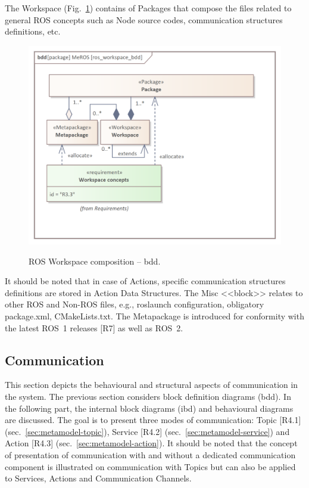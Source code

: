 \documentclass[11pt,oneside,a4paper]{article}
\begin{document}
	
	
	The Workspace (Fig.~\ref{fig:ros_workspace_bdd}) contains of Packages that compose the files related to general ROS concepts such as Node source codes, communication structures definitions, etc. 
	

	\begin{figure}[H]
		\centering
		\begin{center}
			{\includegraphics[scale=1.0]{img/meros_pkg/ros_workspace_bdd.png}}
		\end{center}
		\caption{ROS Workspace composition -- bdd.} 
		\label{fig:ros_workspace_bdd}
	\end{figure}
	
	It should be noted that in case of Actions, specific communication structures definitions are stored in Action Data Structures. The Misc <<block>> relates to other ROS and Non-ROS files, e.g., roslaunch configuration, obligatory package.xml, CMakeLists.txt. The Metapackage is introduced for conformity with the latest ROS~1 releases [R7] as well as ROS~2. 
		

	
	
	
\subsection{Communication}
\label{sec:metamodel-communication}
	
	This section depicts the behavioural and structural aspects of communication in the system. The previous section considers block definition diagrams (bdd). In the following part, the internal block diagrams (ibd) and behavioural diagrams are discussed. The goal is to present three modes of communication: Topic [R4.1] (sec.~\ref{sec:metamodel-topic}), Service [R4.2] (sec.~\ref{sec:metamodel-service}) and Action [R4.3] (sec.~\ref{sec:metamodel-action}). It should be noted that the concept of presentation of communication with and without a dedicated communication component is illustrated on communication with Topics but can also be applied to Services, Actions and Communication Channels.
	
\end{document}

